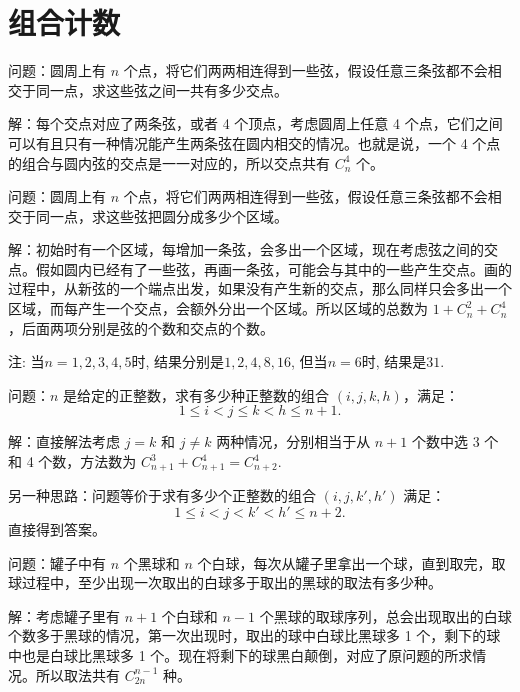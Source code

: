 \newpage

\section{组合计数}

问题：圆周上有 $ n $ 个点，将它们两两相连得到一些弦，假设任意三条弦都不会相交于同一点，求这些弦之间一共有多少交点。

解：每个交点对应了两条弦，或者 4 个顶点，考虑圆周上任意 4 个点，它们之间可以有且只有一种情况能产生两条弦在圆内相交的情况。也就是说，一个 4 个点的组合与圆内弦的交点是一一对应的，所以交点共有 $ C_n^4 $ 个。

\vbox{}

问题：圆周上有 $ n $ 个点，将它们两两相连得到一些弦，假设任意三条弦都不会相交于同一点，求这些弦把圆分成多少个区域。

解：初始时有一个区域，每增加一条弦，会多出一个区域，现在考虑弦之间的交点。假如圆内已经有了一些弦，再画一条弦，可能会与其中的一些产生交点。画的过程中，从新弦的一个端点出发，如果没有产生新的交点，那么同样只会多出一个区域，而每产生一个交点，会额外分出一个区域。所以区域的总数为 $ 1 + C_n^2 + C_n^4 $，后面两项分别是弦的个数和交点的个数。

注: 当$n=1,2,3,4,5$时, 结果分别是$1, 2, 4, 8, 16$, 但当$n=6$时, 结果是$31$.


\newpage


问题：$ n $ 是给定的正整数，求有多少种正整数的组合 $ (i,j,k,h) $，满足：
\[ 1\le i < j \le k < h \le n+1 .\]

解：直接解法考虑 $ j=k $ 和 $ j\neq k $ 两种情况，分别相当于从 $ n+1  $ 个数中选 3 个和 4 个数，方法数为 $ C_{n+1}^3 + C_{n+1}^4 = C_{n+2}^4 $.

另一种思路：问题等价于求有多少个正整数的组合 $ (i,j,k',h') $ 满足：
\[ 1\le i < j < k' < h' \le n+2 .\]
直接得到答案。


\vbox{}

问题：罐子中有 $ n $ 个黑球和 $ n $ 个白球，每次从罐子里拿出一个球，直到取完，取球过程中，至少出现一次取出的白球多于取出的黑球的取法有多少种。

解：考虑罐子里有 $ n + 1 $ 个白球和 $ n - 1 $ 个黑球的取球序列，总会出现取出的白球个数多于黑球的情况，第一次出现时，取出的球中白球比黑球多 1 个，剩下的球中也是白球比黑球多 1 个。现在将剩下的球黑白颠倒，对应了原问题的所求情况。所以取法共有 $ C_{2n}^{n-1} $ 种。

